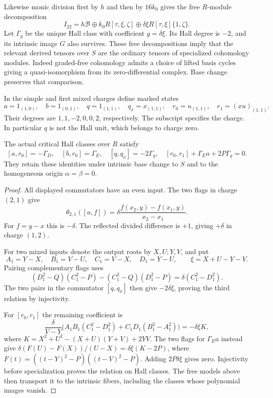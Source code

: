 Likewise monic division first by $h$ and then by $16k_0$ gives
the free $R$-module decomposition
\begin{equation}\label{cyrec:eq:free-two-two}
 I_{22}=h\mathscr B\oplus k_0R[\tau,\xi,\zeta]
                  \oplus\delta\xi R[\tau,\xi]\{1,\zeta\}.
\end{equation}
Let $\Gamma_g$ be the unique Hall class with coefficient
$g=\delta\xi$. Its Hall degree is $-2$, and its intrinsic
image $G$ also survives. These free decompositions imply that
the relevant derived tensors over $S$ are the ordinary tensors
of specialized cohomology modules.
Indeed graded-free cohomology admits a choice of lifted basis
cycles giving a quasi-isomorphism from its zero-differential
complex. Base change preserves that comparison.

In the simple and first mixed charges define marked states
\[
 a=1_{(1,0)},\quad b=1_{(0,1)},\quad
 q=1_{(1,1)},\quad q_x=x_{(1,1)},\quad
 r_0=u_{(1,1)},\quad r_1=(xu)_{(1,1)}.
\]
Their degrees are $1,1,-2,0,0,2$, respectively.
The subscript specifies the charge. In particular $q$ is not
the Hall unit, which belongs to charge zero.

\begin{proposition}\label{cyrec:prop:intrinsic-relations}
The actual critical Hall classes over $R$ satisfy
\begin{equation}\label{cyrec:eq:intrinsic-relations}
 [a,r_0]=-\Gamma_D,\quad [b,r_0]=\Gamma_E,\quad
 [q,q_x]=-2\Gamma_g,\quad
 [r_0,r_1]+\Gamma_Ea+2P\Gamma_g=0.
\end{equation}
They retain these identities under intrinsic base change to
$S$ and to the homogeneous origin $\alpha=\beta=0$.
\end{proposition}

\begin{proof}
All displayed commutators have an even input.
The two flags in charge $(2,1)$ give
\[
 \theta_{2,1}([a,f])
       =\delta\frac{f(x_2,y)-f(x_1,y)}{x_2-x_1}.
\]
For $f=y-x$ this is $-\delta$. The reflected divided difference
is $+1$, giving $+\delta$ in charge $(1,2)$.

For two mixed inputs denote the output roots by $X,U;Y,V$,
and put
\[
 A_1=Y-X,\quad B_1=V-U,\quad C_1=V-X,\quad D_1=Y-U,
 \qquad\xi=X+U-Y-V.
\]
Pairing complementary flags uses
\[
 (D_1^2-Q)(C_1^2-P)-(C_1^2-Q)(D_1^2-P)
                  =\delta(C_1^2-D_1^2).
\]
The two pairs in the commutator $[q,q_x]$ then give
$-2\delta\xi$, proving the third relation by injectivity.

For $[r_0,r_1]$ the remaining coefficient is
\[
 \frac{\delta}{V-Y}
       \bigl(A_1B_1(C_1^2-D_1^2)+C_1D_1(B_1^2-A_1^2)\bigr)
       =-\delta\xi K,
\]
where $K=X^2+U^2-(X+U)(Y+V)+2YV$.
The two flags for $\Gamma_Ea$ instead give
$\delta(F(U)-F(X))/(U-X)=\delta\xi(K-2P)$, where
$F(t)=((t-Y)^2-P)((t-V)^2-P)$.
Adding $2P\delta\xi$ gives zero.
Injectivity before specialization proves the relation on Hall
classes. The free models above then transport it to the intrinsic
fibers, including the classes whose polynomial images vanish.
\end{proof}


